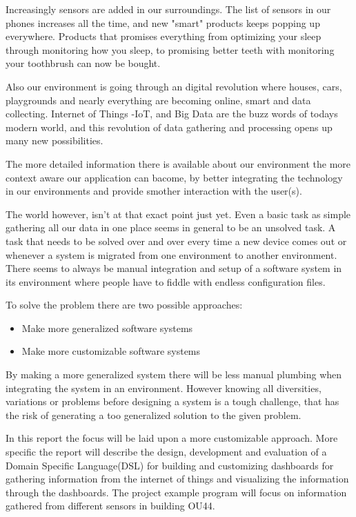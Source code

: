 Increasingly sensors are added in our surroundings. 
The list of sensors in our phones increases all the time, and new "smart" products keeps popping
up everywhere.
Products that promises everything from optimizing your sleep through monitoring how you
sleep\cite{wareable}, to promising better teeth with monitoring your toothbrush\cite{toothbrush}
can now be bought.

Also our environment is going through an digital revolution where houses, cars, playgrounds
and nearly everything are becoming online, smart and data collecting.
Internet of Things -IoT, and Big Data are the buzz words of todays modern world, and this
revolution of data gathering and processing opens up many new possibilities.

The more detailed information there is available about our environment the more context aware
our application can bacome, by better integrating the technology in our environments and provide
smother interaction with the user(s).

The world however, isn't at that exact point just yet. 
Even a basic task as simple gathering all our data in one place seems in general to be an
unsolved task.
A task that needs to be solved over and over every time a new device comes out or whenever
a system is migrated from one environment to another environment. 
There seems to always be manual integration and setup of a software system in its environment
where people have to fiddle with endless configuration files.

To solve the problem there are two possible approaches:
\begin{itemize}
\item Make more generalized software systems
\item Make more customizable software systems
\end{itemize}

By making a more generalized system there will be less manual plumbing when integrating the
system in an environment. 
However knowing all diversities, variations or problems before designing a system is a tough
challenge, that has the risk of generating a too generalized solution to the given problem.

In this report the focus will be laid upon a more customizable approach.
More specific the report will describe the design, development and evaluation of a Domain Specific
Language(DSL) for building and customizing dashboards for gathering information from the internet
of things and visualizing the information through the dashboards. 
The project example program will focus on information gathered from different sensors in
building OU44.

